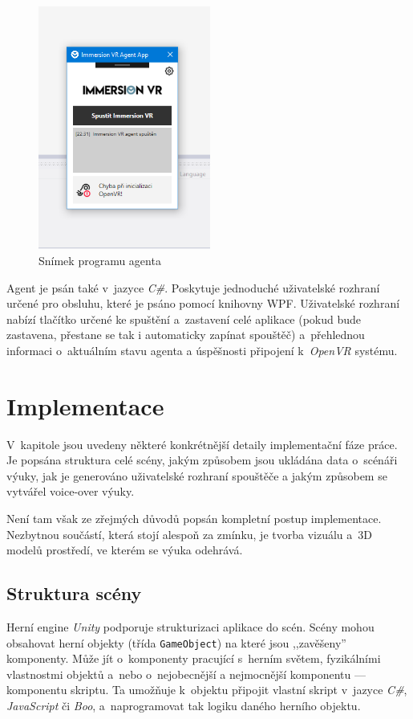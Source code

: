 \begin{figure}[h!]
\centering
\includegraphics[height=8cm]{src/assets/agent-screen.png}
\caption{Snímek programu agenta}
\end{figure}

Agent je psán také v~jazyce \emph{C\#}. Poskytuje jednoduché uživatelské
rozhraní určené pro obsluhu, které je psáno pomocí knihovny WPF.
Uživatelské rozhraní nabízí tlačítko určené ke spuštění a~zastavení celé
aplikace (pokud bude zastavena, přestane se tak i automaticky zapínat
spouštěč) a~přehlednou informaci o~aktuálním stavu agenta a úspěšnosti
připojení k~\emph{OpenVR} systému.

\section{Implementace}\label{implementace}

V~kapitole jsou uvedeny některé konkrétnější detaily implementační fáze
práce. Je popsána struktura celé scény, jakým způsobem jsou ukládána
data o~scénáři výuky, jak je generováno uživatelské rozhraní spouštěče a
jakým způsobem se vytvářel voice-over výuky.

Není tam však ze zřejmých důvodů popsán kompletní postup
implementace. Nezbytnou součástí, která stojí alespoň za zmínku, je
tvorba vizuálu a~3D modelů prostředí, ve kterém se výuka odehrává.

\subsection{Struktura scény}\label{struktura-scuxe9ny}

Herní engine \emph{Unity} podporuje strukturizaci aplikace do scén. Scény mohou
obsahovat herní objekty (třída \texttt{GameObject}) na které jsou
,,zavěšeny'' komponenty. \autocite{unityscenes} Může jít o~komponenty pracující s~herním
světem, fyzikálními vlastnostmi objektů a~nebo o~nejobecnější a
nejmocnější komponentu --- komponentu skriptu. Ta umožňuje k~objektu
připojit vlastní skript v~jazyce \emph{C\#}, \emph{JavaScript} či \emph{Boo}, a~naprogramovat
tak logiku daného herního objektu.

